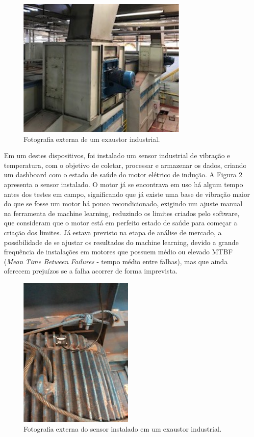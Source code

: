 \begin{figure}[H]
    \caption{Fotografia externa de um exaustor industrial.}
    \begin{center}
        \includegraphics[scale=1.25]{metodologia/img/exaustor.png}
    \end{center}
    \label{fig:exautor}
\end{figure}

Em um destes dispositivos, foi instalado um sensor industrial de vibração e temperatura, com o objetivo de coletar, processar e armazenar os
dados, criando um dashboard com o estado de saúde do motor elétrico de indução. A Figura \ref{fig:sensor_exaustor} apresenta o sensor instalado.
O motor já se encontrava em uso há algum tempo antes dos testes em campo, significando que já existe uma base de vibração maior do que se fosse
um motor há pouco recondicionado, exigindo um ajuste manual na ferramenta de machine learning, reduzindo os limites criados pelo software, que
consideram que o motor está em perfeito estado de saúde para começar a criação dos limites. Já estava previsto na etapa de análise de mercado, 
a possibilidade de se ajustar os resultados do machine learning, devido a grande frequência de instalações em motores que possuem médio ou
elevado MTBF (\textit{Mean Time Between Failures} - tempo médio entre falhas), mas que ainda oferecem prejuízos se a falha acorrer de forma 
imprevista.

\begin{figure}[H]
    \caption{Fotografia externa do sensor instalado em um exaustor industrial.}
    \begin{center}
        \includegraphics[scale=1.1]{metodologia/img/sensor_exaustor.jpg}
    \end{center}
    \label{fig:sensor_exaustor}
\end{figure}

